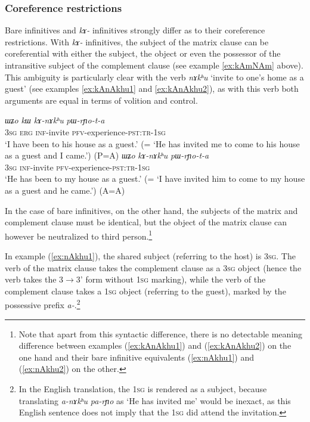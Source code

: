 \documentclass[oneside,a4paper,11pt]{article}
\newcommand{\ipa}[1]{\textit{\phon#1}}
\newcommand{\jpg}[2]{\ipa{#1} `#2'}
\newcommand{\refb}[1]{(\ref{#1})}
\begin{document}
\subsubsection{Coreference restrictions} \label{sec:inf.rYo}
Bare infinitives and \ipa{kɤ-} infinitives strongly differ as to their coreference restrictions. With \ipa{kɤ-} infinitives, the subject of the matrix clause can be coreferential with either the subject, the object or even the possessor of the intransitive subject of the complement clause (see example \ref{ex:kAmNAm} above). This ambiguity is particularly clear with the verb \jpg{nɤkʰu}{invite to one's home as a guest} (see examples \ref{ex:kAnAkhu1} and \ref{ex:kAnAkhu2}), as with this verb both arguments are equal in terms of volition and control.

\begin{exe}
\ex  \label{ex:kAnAkhu1}
\gll
\ipa{ɯʑo} 	\ipa{kɯ} 	\ipa{kɤ-nɤkʰu} 	\ipa{pɯ-rɲo-t-a} \\
\textsc{3sg} \textsc{erg} \textsc{inf}-invite \textsc{pfv}-experience-\textsc{pst:tr-1sg} \\
\glt `I have been to his house as a guest.'  (= `He has invited me to come to his house as a guest and I came.') (P=A)
\ex  \label{ex:kAnAkhu2}
\gll
\ipa{ɯʑo} 	\ipa{kɤ-nɤkʰu} 	\ipa{pɯ-rɲo-t-a} \\
\textsc{3sg}  \textsc{inf}-invite \textsc{pfv}-experience-\textsc{pst:tr-1sg} \\
\glt `He has been to my house as a guest.' (= `I have invited him to come to my house as a guest and he came.') (A=A)
\end{exe}

In the case of bare infinitives, on the other hand, the subjects of the matrix and complement clause must be identical, but the object of the matrix clause can however be neutralized to third person.\footnote{Note that apart from this syntactic difference, there is no detectable meaning difference between examples \refb{ex:kAnAkhu1} and \refb{ex:kAnAkhu2} on the one hand and their bare infinitive equivalents \refb{ex:nAkhu1} and \refb{ex:nAkhu2} on the other. } 

In example \refb{ex:nAkhu1}, the shared subject (referring to the host) is \textsc{3sg}. The verb of the matrix clause takes the complement clause as a \textsc{3sg} object (hence the verb takes the 3$\rightarrow$3' form without \textsc{1sg} marking), while the verb of the complement clause takes a \textsc{1sg} object (referring to the guest), marked by the possessive prefix \ipa{a-}.\footnote{In the English translation, the \textsc{1sg} is rendered as a subject, because translating  \ipa{a-nɤkʰu} \ipa{pa-rɲo} as `He has invited me' would be inexact, as this English sentence does not imply that the \textsc{1sg} did attend the invitation. }
\end{document}
